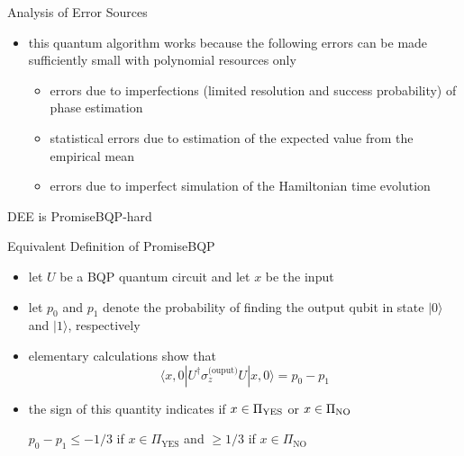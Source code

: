 \documentclass[slideColor]{prosper}
\renewcommand{\>}{\rangle}
\newcommand{\<}{\langle}
\begin{document}

\begin{slide}{Analysis of Error Sources}

\begin{itemize}
\item this quantum algorithm works because the following errors can be made sufficiently small with polynomial resources only

\medskip
\begin{itemize}
\item errors due to imperfections (limited resolution and success probability) of phase estimation

\medskip
\item statistical errors due to estimation of the expected value from the empirical mean

\medskip
\item errors due to imperfect simulation of the Hamiltonian time evolution
\end{itemize}
\end{itemize}
\end{slide}


\begin{slide}{DEE is PromiseBQP-hard}

\end{slide}


\begin{slide}{Equivalent Definition of PromiseBQP}

\begin{itemize}
\item let $U$ be a BQP quantum circuit and let $x$ be the input

\medskip
\item let $p_0$ and $p_1$ denote the probability of finding the output qubit in state $|0\>$ and $|1\>$, respectively

\medskip
\item elementary calculations show that
\[
\<x,0|U^\dagger\sigma_z^{\textrm{(ouput)}} U|x,0\>=p_0 - p_1
\]

\medskip
\item the sign of this quantity indicates if $x\in\Pi_{\rm YES}$ or $x\in\Pi_{\rm NO}$

\bigskip
$p_0 - p_1 \le -1/3$ if $x\in\Pi_{\textrm{YES}}$ and $\ge 1/3$ if $x\in\Pi_{\textrm{NO}}$
\end{itemize}

\end{slide}
\end{document}

